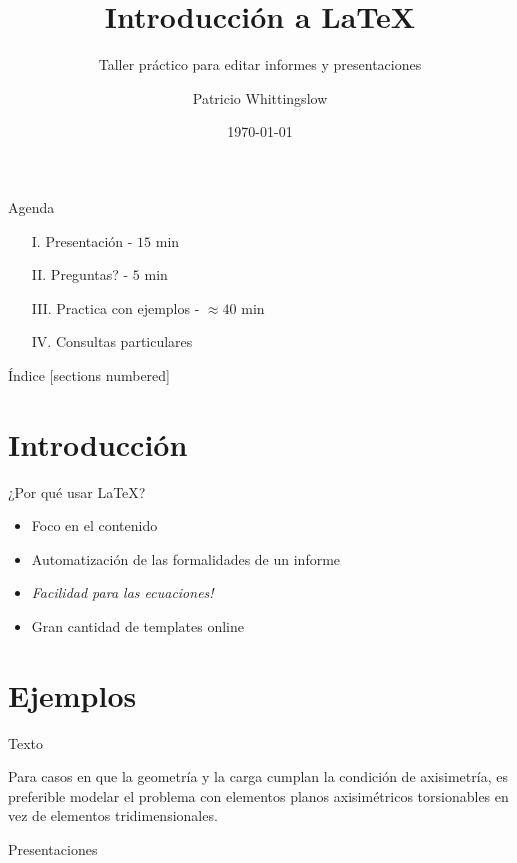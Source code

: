\documentclass[10pt]{beamer}
\title{Introducción a \textrm{\LaTeX}}
\subtitle{Taller práctico para editar informes y presentaciones}
\date{\today}
\author{Patricio Whittingslow}
\begin{document}
\maketitle
\begin{frame}{Agenda}
\begin{itemize}
\item[I.] Presentación - $15$ min
\item[II.] Preguntas? - $5$ min
\item[III.] Practica con ejemplos - $\approx40$ min
\item[IV.] Consultas particulares 
\end{itemize}

\end{frame}
\begin{frame}{Índice}
  [sections numbered]
  \tableofcontents[hideallsubsections]
\end{frame}

\section{Introducción}

\begin{frame}[fragile]{¿Por qué usar LaTeX?}
\begin{itemize}
 \setlength\itemsep{1em}
	
\item Foco en el contenido
\item Automatización de las formalidades de un informe
\item \emph{Facilidad para las ecuaciones!}
\item Gran cantidad de templates online

\end{itemize}
\end{frame}

\section{Ejemplos}

\begin{frame}{Texto}


Para casos en que la geometría y la carga cumplan la condición de axisimetría, es preferible modelar el problema con elementos planos axisimétricos torsionables en vez de elementos tridimensionales.

\end{frame}
\begin{frame}{Presentaciones}
\vspace{0.5cm}

\end{frame}
\end{document}
